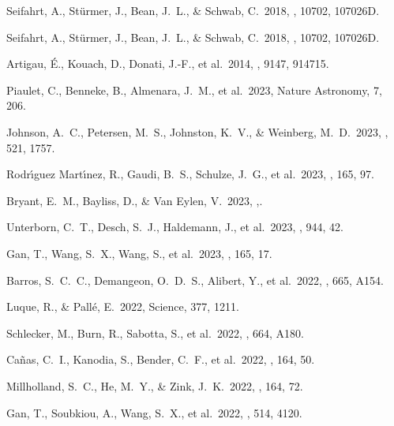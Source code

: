  Seifahrt, A., St{\"u}rmer, J., Bean, J.~L., \& Schwab, C.\ 2018, \procspie, 10702, 107026D.


 Seifahrt, A., St{\"u}rmer, J., Bean, J.~L., \& Schwab, C.\ 2018, \procspie, 10702, 107026D.

 Artigau, {\'E}., Kouach, D., Donati, J.-F., et al.\ 2014, \procspie, 9147, 914715.


 Piaulet, C., Benneke, B., Almenara, J.~M., et al.\ 2023, Nature Astronomy, 7, 206.




 Johnson, A.~C., Petersen, M.~S., Johnston, K.~V., \& Weinberg, M.~D.\ 2023, \mnras, 521, 1757.

 Rodr{\'\i}guez Mart{\'\i}nez, R., Gaudi, B.~S., Schulze, J.~G., et al.\ 2023, \aj, 165, 97.

 Bryant, E.~M., Bayliss, D., \& Van Eylen, V.\ 2023, \mnras,.

 Unterborn, C.~T., Desch, S.~J., Haldemann, J., et al.\ 2023, \apj, 944, 42.

 Gan, T., Wang, S.~X., Wang, S., et al.\ 2023, \aj, 165, 17.

 Barros, S.~C.~C., Demangeon, O.~D.~S., Alibert, Y., et al.\ 2022, \aap, 665, A154.

 Luque, R., \& Pall{\'e}, E.\ 2022, Science, 377, 1211.

 Schlecker, M., Burn, R., Sabotta, S., et al.\ 2022, \aap, 664, A180.

 Ca{\~n}as, C.~I., Kanodia, S., Bender, C.~F., et al.\ 2022, \aj, 164, 50.

 Millholland, S.~C., He, M.~Y., \& Zink, J.~K.\ 2022, \aj, 164, 72.

 Gan, T., Soubkiou, A., Wang, S.~X., et al.\ 2022, \mnras, 514, 4120.


